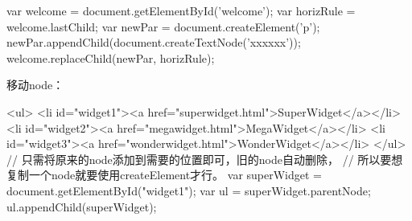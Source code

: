 \begin{javascriptcode}
  var welcome = document.getElementById('welcome');
  var horizRule = welcome.lastChild;
  var newPar = document.createElement('p');
  newPar.appendChild(document.createTextNode('xxxxxx'));
  welcome.replaceChild(newPar, horizRule);
\end{javascriptcode}

移动node：

\begin{javascriptcode}
  <ul>
    <li id="widget1"><a href="superwidget.html">SuperWidget</a></li>
    <li id="widget2"><a href="megawidget.html">MegaWidget</a></li>
    <li id="widget3"><a href="wonderwidget.html">WonderWidget</a></li>
  </ul>
  // 只需将原来的node添加到需要的位置即可，旧的node自动删除，
  // 所以要想复制一个node就要使用createElement才行。
  var superWidget = document.getElementById("widget1");
  var ul = superWidget.parentNode;
  ul.appendChild(superWidget);
\end{javascriptcode}
